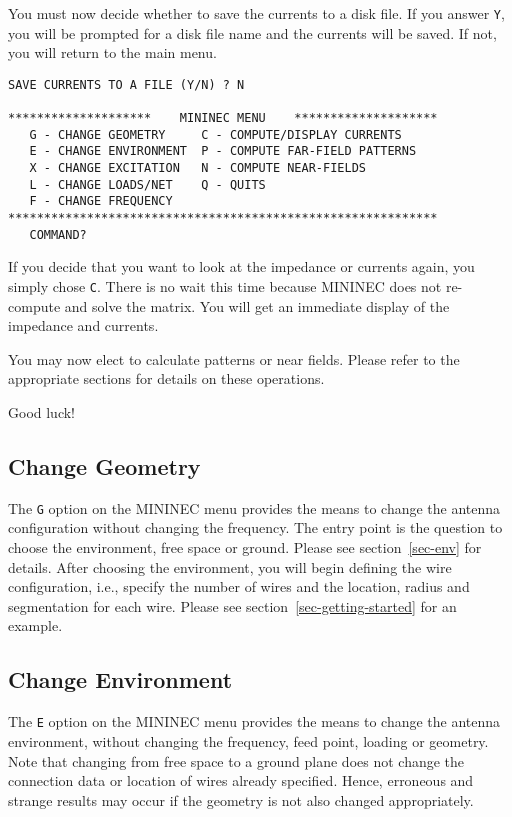 \documentclass[12pt]{article}
\begin{document}
You must now decide whether to save the currents to a disk file. If you
answer \verb+Y+, you will be prompted for a disk file name and the
currents will be saved. If not, you will return to the main menu.

\begin{Verbatim}
SAVE CURRENTS TO A FILE (Y/N) ? N

********************    MININEC MENU    ********************
   G - CHANGE GEOMETRY     C - COMPUTE/DISPLAY CURRENTS
   E - CHANGE ENVIRONMENT  P - COMPUTE FAR-FIELD PATTERNS
   X - CHANGE EXCITATION   N - COMPUTE NEAR-FIELDS
   L - CHANGE LOADS/NET    Q - QUITS
   F - CHANGE FREQUENCY
************************************************************
   COMMAND?
\end{Verbatim}

If you decide that you want to look at the impedance or currents again,
you simply chose \verb+C+. There is no wait this time because MININEC
does not re-compute and solve the matrix. You will get an immediate
display of the impedance and currents.

You may now elect to calculate patterns or near fields. Please refer to
the appropriate sections for details on these operations.

Good luck!

\subsection{Change Geometry}
The \verb+G+ option on the MININEC menu provides the means to change the
antenna configuration without changing the frequency. The entry point is
the question to choose the environment, free space or ground. Please see
section~\ref{sec-env} for details. After choosing the environment, you
will begin defining the wire configuration, i.e., specify the number of
wires and the location, radius and segmentation for each wire. Please
see section~\ref{sec-getting-started} for an example.

\subsection{Change Environment}
\label{sec-change-env}
The \verb+E+ option on the MININEC menu provides the means to change the
antenna environment, without changing the frequency, feed point, loading
or geometry. Note that changing from free space to a ground plane does
not change the connection data or location of wires already specified.
Hence, erroneous and strange results may occur if the geometry is not
also changed appropriately.
\end{document}
